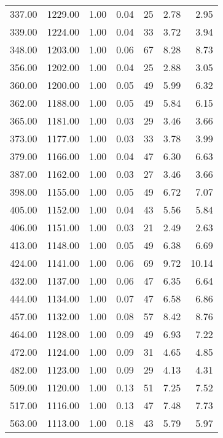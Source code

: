 \begin{table}
\begin{tabular}{rrrrrrr}
337.00 & 1229.00 & 1.00 & 0.04 & 25 & 2.78 & 2.95 \\
339.00 & 1224.00 & 1.00 & 0.04 & 33 & 3.72 & 3.94 \\
348.00 & 1203.00 & 1.00 & 0.06 & 67 & 8.28 & 8.73 \\
356.00 & 1202.00 & 1.00 & 0.04 & 25 & 2.88 & 3.05 \\
360.00 & 1200.00 & 1.00 & 0.05 & 49 & 5.99 & 6.32 \\
362.00 & 1188.00 & 1.00 & 0.05 & 49 & 5.84 & 6.15 \\
365.00 & 1181.00 & 1.00 & 0.03 & 29 & 3.46 & 3.66 \\
373.00 & 1177.00 & 1.00 & 0.03 & 33 & 3.78 & 3.99 \\
379.00 & 1166.00 & 1.00 & 0.04 & 47 & 6.30 & 6.63 \\
387.00 & 1162.00 & 1.00 & 0.03 & 27 & 3.46 & 3.66 \\
398.00 & 1155.00 & 1.00 & 0.05 & 49 & 6.72 & 7.07 \\
405.00 & 1152.00 & 1.00 & 0.04 & 43 & 5.56 & 5.84 \\
406.00 & 1151.00 & 1.00 & 0.03 & 21 & 2.49 & 2.63 \\
413.00 & 1148.00 & 1.00 & 0.05 & 49 & 6.38 & 6.69 \\
424.00 & 1141.00 & 1.00 & 0.06 & 69 & 9.72 & 10.14 \\
432.00 & 1137.00 & 1.00 & 0.06 & 47 & 6.35 & 6.64 \\
444.00 & 1134.00 & 1.00 & 0.07 & 47 & 6.58 & 6.86 \\
457.00 & 1132.00 & 1.00 & 0.08 & 57 & 8.42 & 8.76 \\
464.00 & 1128.00 & 1.00 & 0.09 & 49 & 6.93 & 7.22 \\
472.00 & 1124.00 & 1.00 & 0.09 & 31 & 4.65 & 4.85 \\
482.00 & 1123.00 & 1.00 & 0.09 & 29 & 4.13 & 4.31 \\
509.00 & 1120.00 & 1.00 & 0.13 & 51 & 7.25 & 7.52 \\
517.00 & 1116.00 & 1.00 & 0.13 & 47 & 7.48 & 7.73 \\
563.00 & 1113.00 & 1.00 & 0.18 & 43 & 5.79 & 5.97 \\
\bottomrule
\end{tabular}
\end{table}
